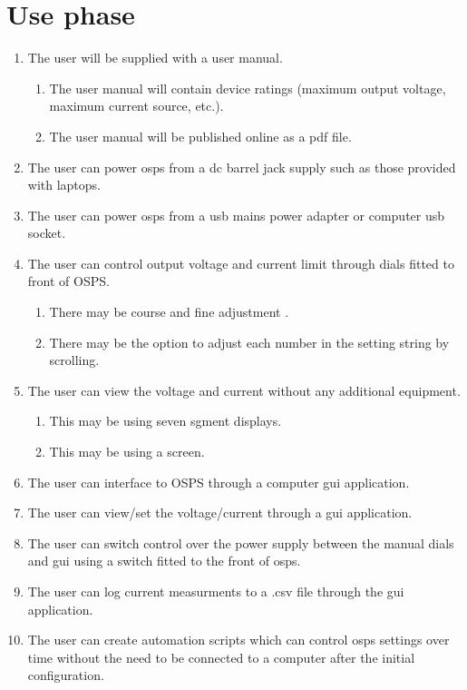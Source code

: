 \documentclass[12pt,a4paper]{article}
\begin{document}
\section{Use phase}
\begin{enumerate}
\item The user will be supplied with a user manual.
	\begin{enumerate}[label*=\arabic*.]
	\item The user manual will contain device ratings (maximum output voltage, maximum current source, etc.).
	\item The user manual will be published online as a pdf file.
	\end{enumerate}
\item The user can power \gls{osps} from a \gls{dc} barrel jack supply such as those provided with laptops.
\item The user can power \gls{osps} from a \gls{usb} mains power adapter  or computer \gls{usb} socket.
\item The user can control output voltage and current limit through dials fitted to front of OSPS.
	\begin{enumerate}[label*=\arabic*.]
	\item There may be  course and fine adjustment .
	\item There may be the option to adjust each number in the setting string by scrolling. 
	\end{enumerate}
\item The user can view the voltage and current without any additional equipment.
	\begin{enumerate}[label*=\arabic*.]
	\item This may be using seven sgment displays.
	\item This may be using a screen.
	\end{enumerate}
\item The user can interface to OSPS through a computer \gls{gui} application.
\item The user can view/set the voltage/current through a \gls{gui} application.
\item The user can switch control over the power supply between the manual dials and \gls{gui} using a switch fitted to the front of \gls{osps}.
\item The user can log current measurments to a .csv file through the \gls{gui} application.
\item The user can create automation scripts which can control \gls{osps} settings over time without the need to be connected to a computer after the initial configuration.
\end{enumerate}
\end{document}
